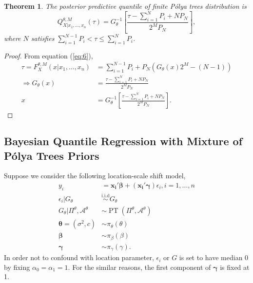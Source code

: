 \documentclass[12pt]{article}
\newtheorem{thm}{Theorem}[subsection]
\newcommand{\polya}{P\'{o}lya}
\newcommand{\iid}{\stackrel{\text{i.i.d}}{\sim}}
\DeclareMathOperator{\pt}{PT}
\begin{document}
\begin{thm}
The posterior predictive quantile of finite \polya{} trees
distribution is 
\begin{equation}
\label{eq:7}
Q^{\theta, M}_{X|x_1, \ldots, x_n}(\tau) = G^{-1}_{\theta} \left[
  \frac{\tau- \sum_{i=1}^N P_i + N P_N}{2^M P_N} \right],
\end{equation}
where $N$ satisfies $ \sum_{i=1}^{N-1} P_i < \tau \le \sum_{i=1}^N P_i$.
\end{thm}

\begin{proof}
From equation (\ref{eq:6}), 
\begin{align*}
\tau = F^{\theta,M}_X(x|x_1, \ldots, x_n) &= \sum_{i=1}^{N-1} P_{i} + P_N
\left( G_{\theta}(x)2^M -(N-1) \right) \\
\Rightarrow G_{\theta}(x) &= \frac{\tau - \sum_{i=1}^NP_i +
  NP_N}{2^MP_N} \\
x & = G_{\theta}^{-1} \left[\frac{\tau - \sum_{i=1}^NP_i +
  NP_N}{2^MP_N}  \right].
\end{align*}
\end{proof}

\subsection{Bayesian Quantile Regression with Mixture of \polya{}
  Trees Priors}
Suppose we consider the following location-scale shift model, 
\begin{align*}
y_i& = \bm{x_i'\beta} + (\bm{x_i'\gamma}) \epsilon_{i}, i = 1, \ldots,
n \\
\epsilon_i |G_{\theta} & \iid G_{\theta} \\
G_{\theta}|\Pi^{\theta}, \mathcal{A}^{\theta} & \sim \pt
(\Pi^{\theta}, \mathcal{A}^{\theta}) \\
\bm{\theta} = (\sigma^2, c) & \sim \pi_{\theta}(\theta) \\
\bm{\beta} & \sim \pi_{\beta}(\beta)\\
\bm{\gamma} &\sim \pi_{\gamma}(\gamma).
\end{align*} 
In order not to confound with location parameter, $\epsilon_i $ or $G$
is set to have median 0 by fixing $\alpha_0=\alpha_1 = 1$. For the
similar reasons,
the first component of $\bm{\gamma}$ is fixed
at 1. 
\end{document}
